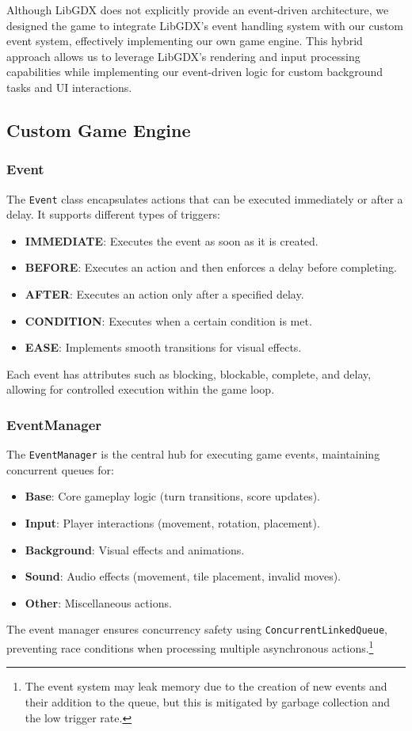 \documentclass[conference]{IEEEtran}
\begin{document}
Although LibGDX does not explicitly provide an event-driven architecture, we
designed the game to integrate LibGDX's event handling system with our custom
event system, effectively implementing our own game engine. This hybrid
approach allows us to leverage LibGDX's rendering and input processing
capabilities while implementing our event-driven logic for custom background
tasks and UI interactions.

\subsection{Custom Game Engine}
\subsubsection{Event}
The \texttt{Event} class encapsulates actions that can be executed immediately
or after a delay. It supports different types of triggers:
\begin{itemize}
    \item \textbf{IMMEDIATE}: Executes the event as soon as it is created.
    \item \textbf{BEFORE}: Executes an action and then enforces a delay before completing.
    \item \textbf{AFTER}: Executes an action only after a specified delay.
    \item \textbf{CONDITION}: Executes when a certain condition is met.
    \item \textbf{EASE}: Implements smooth transitions for visual effects.
\end{itemize}
Each event has attributes such as blocking, blockable, complete, and delay, allowing for controlled execution within the game loop.

\subsubsection{EventManager}
The \texttt{EventManager} is the central hub for executing game events,
maintaining concurrent queues for:
\begin{itemize}
    \item \textbf{Base}: Core gameplay logic (turn transitions, score updates).
    \item \textbf{Input}: Player interactions (movement, rotation, placement).
    \item \textbf{Background}: Visual effects and animations.
    \item \textbf{Sound}: Audio effects (movement, tile placement, invalid moves).
    \item \textbf{Other}: Miscellaneous actions.
\end{itemize}
The event manager ensures concurrency safety using \texttt{ConcurrentLinkedQueue},
preventing race conditions when processing multiple asynchronous actions.\footnote{The event system may leak memory due to the creation of new events and their addition to the queue, but this is mitigated by garbage collection and the low trigger rate.}
\end{document}
